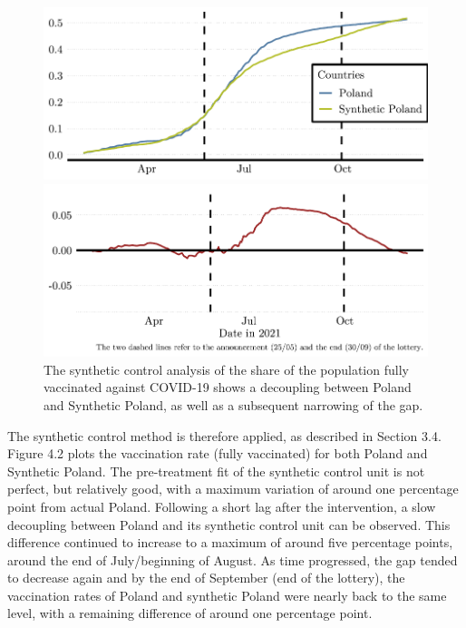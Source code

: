 \documentclass{scrbook}
\begin{document}
\begin{figure}[h]
\caption[Synthetic control analysis of the Polish lottery (share of the fully vaccinated)]{The synthetic control analysis of the share of the population fully vaccinated against COVID-19 shows a decoupling between Poland and Synthetic Poland, as well as a subsequent narrowing of the gap.}

\begin{center}\includegraphics{bachelor_thesis_files/figure-latex/unnamed-chunk-3-1} \end{center}



\begin{center}\includegraphics{bachelor_thesis_files/figure-latex/unnamed-chunk-3-2} \end{center}
\end{figure}

\vspace{-0.5cm}

The synthetic control method is therefore applied, as described in
Section 3.4. Figure 4.2 plots the vaccination rate (fully vaccinated)
for both Poland and Synthetic Poland. The pre-treatment fit of the
synthetic control unit is not perfect, but relatively good, with a
maximum variation of around one percentage point from actual Poland.
Following a short lag after the intervention, a slow decoupling between
Poland and its synthetic control unit can be observed. This difference
continued to increase to a maximum of around five percentage points,
around the end of July/beginning of August. As time progressed, the gap
tended to decrease again and by the end of September (end of the
lottery), the vaccination rates of Poland and synthetic Poland were
nearly back to the same level, with a remaining difference of around one
percentage point.
\end{document}

